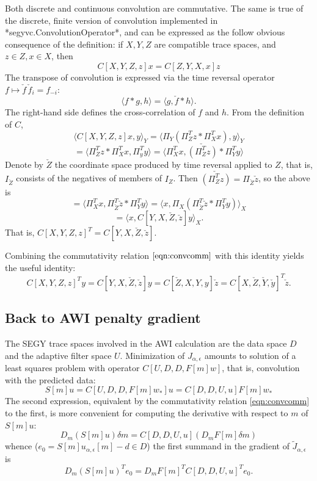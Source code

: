 Both discrete and continuous convolution are commutative. The same is true of the discrete, finite version of convolution implemented in *segyvc.ConvolutionOperator*, and can be expressed as the follow obvious consequence of the definition: if $X, Y, Z$ are compatible trace spaces, and $z \in Z, x \in X$, then
\begin{equation}
C[X,Y,Z,z]x = C[Z,Y,X,x]z
\label{eqn:convcomm}
\end{equation}
The transpose of convolution is expressed via the time reversal operator $f \mapsto \check{f}\, \check{f}_i = f_{-i}$:  
$$
\langle f*g,h \rangle = \langle g, \check{f}*h \rangle.
$$ 
The right-hand side defines the cross-correlation of $f$ and $h$. From the definition of $C$,
$$
\langle C[X,Y,Z,z]x, y\rangle_Y = \langle \Pi_Y(\Pi_Z^T z * \Pi_X^T x), y \rangle_Y
$$
$$
= \langle \Pi_Z^T z * \Pi_X^T x, \Pi_y^T y \rangle = \langle \Pi_X^T x, \check{(\Pi_Z^T z)}* \Pi_Y^T y \rangle
$$
Denote by $\check{Z}$ the coordinate space produced by time reversal applied to $Z$, that is, $I_{\check{Z}}$ consists of the negatives of members of $I_Z$. Then $\check{(\Pi_Z^T z)}=\Pi_{\check{Z}}\check{z}$, so the above is
$$
=\langle \Pi_X^T x, \Pi_{\check{Z}}^T \check{z} * \Pi_Y^T y \rangle =\langle x, \Pi_X(\Pi_{\check{Z}}^T \check{z} * \Pi_Y^T y) \rangle_X
$$
$$
= \langle x, C[Y,X,\check{Z},\check{z}]y \rangle_X.
$$
That is, $C[X,Y,Z,z]^T = C[Y,X,\check{Z},\check{z}]$.

Combining the commutativity relation $\ref{eqn:convcomm}$ with this identity yields the useful identity:
\begin{equation}
C[X,Y,Z,z]^Ty = C[Y,X,\check{Z},\check{z}]y =
C[\check{Z},X,Y,y]\check{z} =
C[X,\check{Z},\check{Y},\check{y}]^T\check{z}.
\label{eqn:convcommtransp}
\end{equation}

\subsection{Back to AWI penalty gradient}

The SEGY trace spaces involved in the AWI calculation are the data space $D$ and the adaptive filter space $U$. Minimization of $J_{\alpha,\epsilon}$ amounts to solution of a least squares problem with operator $C[U,D,D,F[m]w]$, that is, convolution with the predicted data:
$$
S[m]u = C[U,D,D,F[m]w_*]u = C[D,D,U,u]F[m]w_*
$$
The second expression, equivalent by the commutativity relation \ref{eqn:convcomm} to the first, is more convenient for computing the derivative with respect to $m$ of $S[m]u$:
$$
D_m(S[m]u) \delta m = C[D,D,U,u](D_mF[m]\delta m)
$$
whence ($e_0 = S[m]u_{\alpha,\epsilon}[m]-d \in D$) the first summand in the gradient of $\tilde{J}_{\alpha,\epsilon}$ is
$$
D_m(S[m]u)^T e_0 = D_mF[m]^TC[D,D,U,u]^Te_0.
$$

